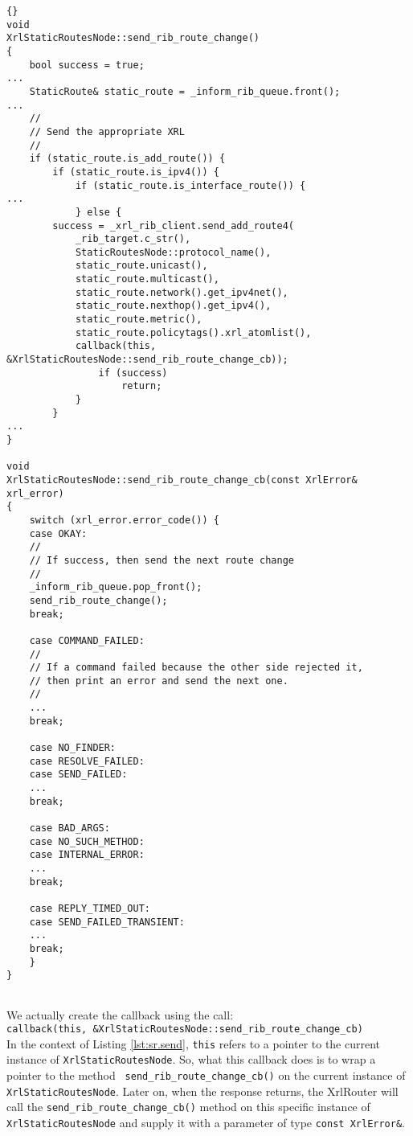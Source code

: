 \documentclass[11pt]{article}
\newcommand{\stt}{\tt\small}
\begin{document}
\begin{lstlisting}[caption={Extracts from {\stt xorp/static\_routes/xrl\_static\_routes\_node.cc} %
                                     \label{lst:sr.send} } ]{}
void
XrlStaticRoutesNode::send_rib_route_change()
{
    bool success = true;
...
    StaticRoute& static_route = _inform_rib_queue.front();
...
    //
    // Send the appropriate XRL
    //
    if (static_route.is_add_route()) {
        if (static_route.is_ipv4()) {
            if (static_route.is_interface_route()) {
...
            } else {
		success = _xrl_rib_client.send_add_route4(
		    _rib_target.c_str(),
		    StaticRoutesNode::protocol_name(),
		    static_route.unicast(),
		    static_route.multicast(),
		    static_route.network().get_ipv4net(),
		    static_route.nexthop().get_ipv4(),
		    static_route.metric(),
		    static_route.policytags().xrl_atomlist(),
		    callback(this, &XrlStaticRoutesNode::send_rib_route_change_cb));
                if (success)
                    return;
            }
        }
...
}

void
XrlStaticRoutesNode::send_rib_route_change_cb(const XrlError& xrl_error)
{
    switch (xrl_error.error_code()) {
    case OKAY:
	//
	// If success, then send the next route change
	//
	_inform_rib_queue.pop_front();
	send_rib_route_change();
	break;

    case COMMAND_FAILED:
	//
	// If a command failed because the other side rejected it,
	// then print an error and send the next one.
	//
	...
	break;

    case NO_FINDER:
    case RESOLVE_FAILED:
    case SEND_FAILED:
	...
	break;

    case BAD_ARGS:
    case NO_SUCH_METHOD:
    case INTERNAL_ERROR:
	...
	break;

    case REPLY_TIMED_OUT:
    case SEND_FAILED_TRANSIENT:
	...
	break;
    }
}


\end{lstlisting}
\newpage
\noindent We actually create the callback using the call:\\ {\stt callback(this,
\&XrlStaticRoutesNode::send\_rib\_route\_change\_cb)}\\ In the context of
Listing \ref{lst:sr.send}, {\stt this} refers to a pointer to the
current instance of {\stt XrlStaticRoutesNode}.  So, what this
callback does is to wrap a pointer to the method {\stt
send\_rib\_route\_change\_cb()} on the current instance of {\stt
XrlStaticRoutesNode}.  Later on, when the response returns, the
XrlRouter will call the {\stt send\_rib\_route\_change\_cb()} method on
this specific instance of {\stt XrlStaticRoutesNode} and supply it
with a parameter of type {\stt const XrlError\&}.
\end{document}
